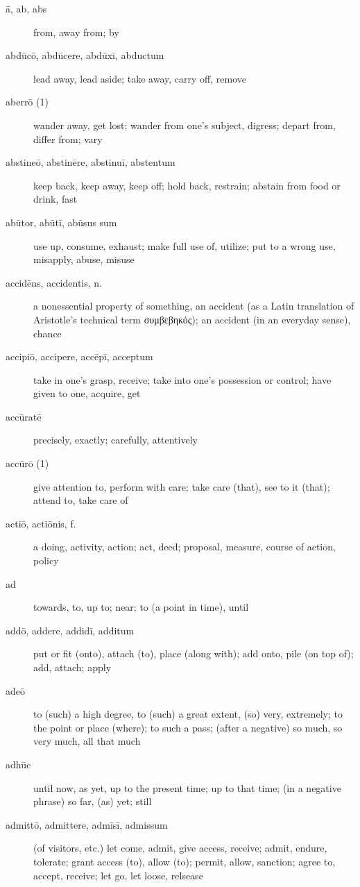 \begin{description}
    \item[ā, ab, abs] \marginnote{*}from, away from; by
    \item[abdūcō, abdūcere, abdūxī, abductum] lead away, lead aside; take away, carry off, remove
    \item[aberrō (1)] wander away, get lost; wander from one's subject, digress; depart from, differ from; vary
    \item[abstineō, abstinēre, abstinuī, abstentum] keep back, keep away, keep off; hold back, restrain; abstain from food or drink, fast
    \item[abūtor, abūtī, abūsus sum]  use up, consume, exhaust; make full use of, utilize; put to a wrong use, misapply, abuse, misuse
    \item[accidēns, accidentis, n.] a nonessential property of something, an accident (as a Latin translation of Aristotle's technical term \textgreek{συμβεβηκός}); an accident (in an everyday sense), chance
    \item[accipiō, accipere, accēpī, acceptum] \marginnote{*}take in one's grasp, receive; take into one's possession or control; have given to one, acquire, get
    \item[accūratē] precisely, exactly; carefully, attentively
    \item[accūrō (1)] give attention to, perform with care; take care (that), see to it (that); attend to, take care of
    \item[actiō, actiōnis, f.] a doing, activity, action; act, deed; proposal, measure, course of action, policy
    \item[ad] \marginnote{*}towards, to, up to; near; to (a point in time), until
    \item[addō, addere, addidī, additum] \marginnote{*}put or fit (onto), attach (to), place (along with); add onto, pile (on top of); add, attach; apply
    \item[adeō] \marginnote{*}to (such) a high degree, to (such) a great extent, (so) very, extremely; to the point or place (where); to such a pass; (after a negative) so much, so very much, all that much
    \item[adhūc] \marginnote{*}until now, as yet, up to the present time; up to that time; (in a negative phrase) so far, (as) yet; still
    \item[admittō, admittere, admīsī, admissum] (of visitors, etc.) let come, admit, give access, receive; admit, endure, tolerate; grant access (to), allow (to); permit, allow, sanction; agree to, accept, receive; let go, let loose, relsease

\end{description}
